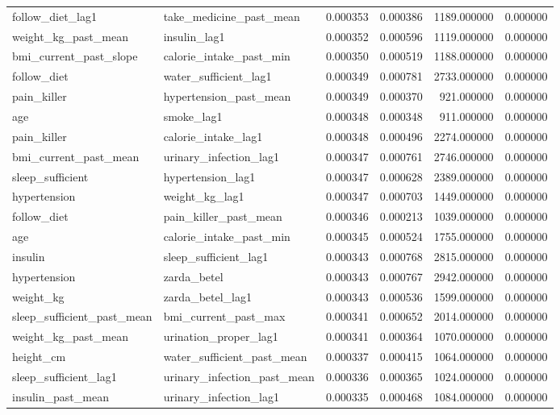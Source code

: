 \begin{longtable}{llrrrr}
follow\_diet\_lag1 & take\_medicine\_past\_mean & 0.000353 & 0.000386 & 1189.000000 & 0.000000 \\
weight\_kg\_past\_mean & insulin\_lag1 & 0.000352 & 0.000596 & 1119.000000 & 0.000000 \\
bmi\_current\_past\_slope & calorie\_intake\_past\_min & 0.000350 & 0.000519 & 1188.000000 & 0.000000 \\
follow\_diet & water\_sufficient\_lag1 & 0.000349 & 0.000781 & 2733.000000 & 0.000000 \\
pain\_killer & hypertension\_past\_mean & 0.000349 & 0.000370 & 921.000000 & 0.000000 \\
age & smoke\_lag1 & 0.000348 & 0.000348 & 911.000000 & 0.000000 \\
pain\_killer & calorie\_intake\_lag1 & 0.000348 & 0.000496 & 2274.000000 & 0.000000 \\
bmi\_current\_past\_mean & urinary\_infection\_lag1 & 0.000347 & 0.000761 & 2746.000000 & 0.000000 \\
sleep\_sufficient & hypertension\_lag1 & 0.000347 & 0.000628 & 2389.000000 & 0.000000 \\
hypertension & weight\_kg\_lag1 & 0.000347 & 0.000703 & 1449.000000 & 0.000000 \\
follow\_diet & pain\_killer\_past\_mean & 0.000346 & 0.000213 & 1039.000000 & 0.000000 \\
age & calorie\_intake\_past\_min & 0.000345 & 0.000524 & 1755.000000 & 0.000000 \\
insulin & sleep\_sufficient\_lag1 & 0.000343 & 0.000768 & 2815.000000 & 0.000000 \\
hypertension & zarda\_betel & 0.000343 & 0.000767 & 2942.000000 & 0.000000 \\
weight\_kg & zarda\_betel\_lag1 & 0.000343 & 0.000536 & 1599.000000 & 0.000000 \\
sleep\_sufficient\_past\_mean & bmi\_current\_past\_max & 0.000341 & 0.000652 & 2014.000000 & 0.000000 \\
weight\_kg\_past\_mean & urination\_proper\_lag1 & 0.000341 & 0.000364 & 1070.000000 & 0.000000 \\
height\_cm & water\_sufficient\_past\_mean & 0.000337 & 0.000415 & 1064.000000 & 0.000000 \\
sleep\_sufficient\_lag1 & urinary\_infection\_past\_mean & 0.000336 & 0.000365 & 1024.000000 & 0.000000 \\
insulin\_past\_mean & urinary\_infection\_lag1 & 0.000335 & 0.000468 & 1084.000000 & 0.000000 \\

\end{longtable}
